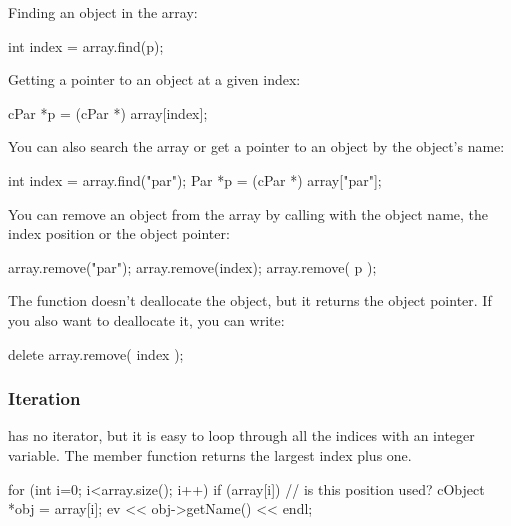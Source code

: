 Finding an object in the array:

\begin{cpp}
int index = array.find(p);
\end{cpp}

Getting a pointer to an object at a given index:

\begin{cpp}
cPar *p = (cPar *) array[index];
\end{cpp}

You can also search the array or get a pointer to an object by
the object's name:

\begin{cpp}
int index = array.find("par");
Par *p = (cPar *) array["par"];
\end{cpp}


You can remove an object from the array by calling 
with the object name, the index position or the object pointer:

\begin{cpp}
array.remove("par");
array.remove(index);
array.remove( p );
\end{cpp}


The  function doesn't deallocate the object, but it
returns the object pointer. If you also want to deallocate it, you can
write:

\begin{cpp}
delete array.remove( index );
\end{cpp}

\subsubsection{Iteration}


 has no iterator, but it is easy to loop through all the
indices with an integer variable. The  member function
returns the largest index plus one.

\begin{cpp}
for (int i=0; i<array.size(); i++)
{
    if (array[i]) // is this position used?
    {
        cObject *obj = array[i];
        ev << obj->getName() << endl;
    }
}
\end{cpp}


%
%
%
%



